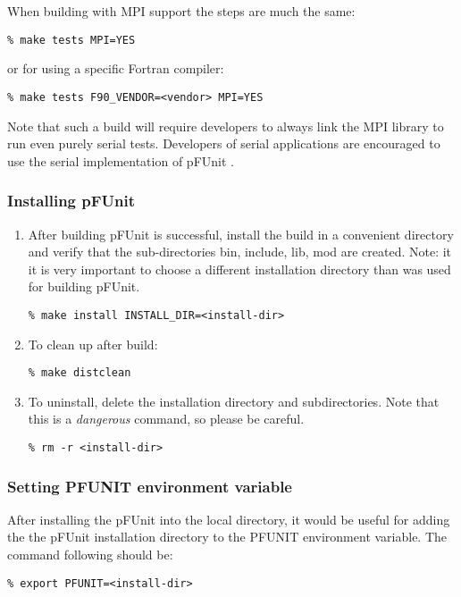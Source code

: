 \documentclass[10pt]{article}
\newcommand{\pfunit}{{\sc pFUnit }}
\begin{document}
When building with MPI support the steps are much the same:	
\begin{verbatim}
% make tests MPI=YES
\end{verbatim}
or for using a specific Fortran compiler:
\begin{verbatim}
% make tests F90_VENDOR=<vendor> MPI=YES
\end{verbatim}
Note that such a build will require developers to always link the MPI
library to run even purely serial tests.  Developers of serial
applications are encouraged to use the serial implementation of
\pfunit.

\subsubsection{Installing \pfunit}
\begin{enumerate}
\item After building \pfunit is successful, install the build in a
  convenient directory and verify that the sub-directories bin,
  include, lib, mod are created.  Note: it it is very important to
  choose a different installation directory than was used for building pFUnit.
\begin{verbatim}
% make install INSTALL_DIR=<install-dir>
\end{verbatim}

\item To clean up after build:
\begin{verbatim}
% make distclean
\end{verbatim}

\item To uninstall, delete the installation directory and
  subdirectories.  Note that this is a \emph{dangerous} command, so
  please be careful.
\begin{verbatim}
% rm -r <install-dir>
\end{verbatim}
\end{enumerate}

\subsubsection{Setting PFUNIT environment variable}
After installing the \pfunit into the local directory, it would be
useful for adding the the \pfunit installation directory to the PFUNIT
environment variable.  The command following should be:
\begin{verbatim}
% export PFUNIT=<install-dir>
\end{verbatim}
\end{document}
